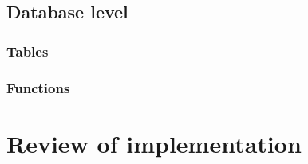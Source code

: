 \subsection{Database level}

\subsubsection{Tables}

\subsubsection{Functions}


\section{Review of implementation}